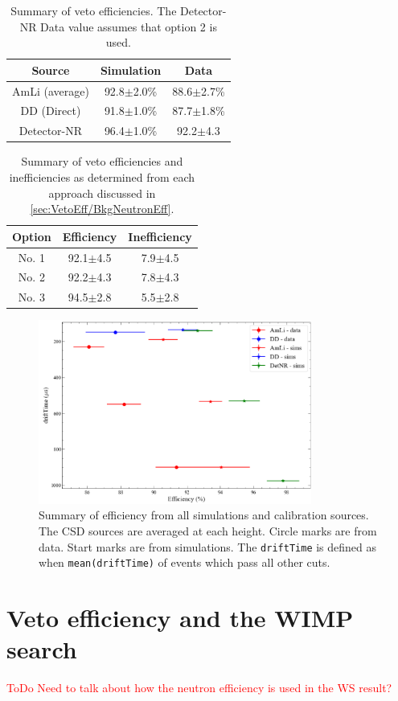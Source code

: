 \begin{table}[!ht]
	\centering
	\caption{Summary of veto efficiencies. The Detector-NR Data value assumes that option 2 is used.}
	\begin{tabular}{|c|c|c|}
    \hline
		\textbf{Source}& \textbf{Simulation}& \textbf{Data}\\ 
        \hline
		AmLi (average) & 92.8$\pm$2.0\% & 88.6$\pm$2.7\% \\
		DD (Direct)    & 91.8$\pm$1.0\% & 87.7$\pm$1.8\% \\
		Detector-NR    & 96.4$\pm$1.0\% & 92.2$\pm$4.3\\
        \hline
	\end{tabular}
	\label{tab:VetoEff/final_veto_efficiency}
\end{table}

\begin{table}[!ht]
	\caption{Summary of veto efficiencies and inefficiencies as determined from each approach discussed in \autoref{sec:VetoEff/BkgNeutronEff}.}
	\centering
	\begin{tabular}{|c|c|c|}
		\hline
        \textbf{Option} & \textbf{Efficiency}& \textbf{Inefficiency} \\ 
        \hline
		No. 1  & 92.1$\pm$4.5 & 7.9$\pm$4.5  \\
		No. 2  & 92.2$\pm$4.3 & 7.8$\pm$4.3  \\
		No. 3  & 94.5$\pm$2.8 & 5.5$\pm$2.8 \\
        \hline
	\end{tabular}
	\label{tab:VetoEff/efficiency_options}
\end{table}

\begin{figure}[!ht]
	\centering
	\includegraphics[width=0.8\textwidth]{figures/VetoEfficiency/efficiency_summary.png}
	\caption{Summary of efficiency from all simulations and calibration sources.
		The CSD sources are averaged at each height.
		Circle marks are from data.
		Start marks are from simulations.
		The \lstinline{driftTime} is defined as when \lstinline{mean(driftTime)} of events which pass all other cuts.
	}
	\label{fig:VetoEff/efficiency_summary}
\end{figure}

\section{Veto efficiency and the WIMP search}\label{sec:VetoEff4WIMPSearch}
\textcolor{red}{ToDo Need to talk about how the neutron efficiency is used in the WS result?}